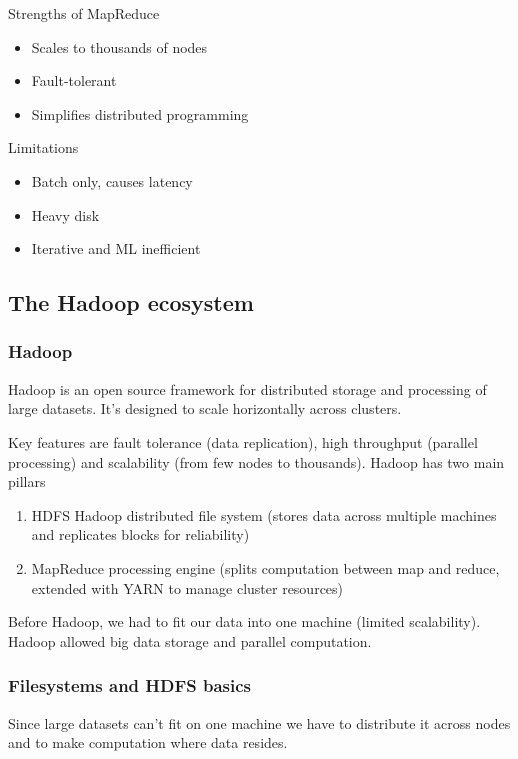 Strengths of MapReduce
\begin{itemize}
    \item Scales to thousands of nodes
    \item Fault-tolerant
    \item Simplifies distributed programming
\end{itemize}

Limitations
\begin{itemize}
    \item Batch only, causes latency
    \item Heavy disk
    \item Iterative and ML inefficient
\end{itemize}

\subsection{The Hadoop ecosystem}

\subsubsection{Hadoop}

Hadoop is an open source framework for distributed storage and processing of large datasets. It's designed to scale horizontally across clusters.

Key features are fault tolerance (data replication), high throughput (parallel processing) and scalability (from few nodes to thousands). 
Hadoop has two main pillars

\begin{enumerate}
    \item HDFS \ra Hadoop distributed file system (stores data across multiple machines and replicates blocks for reliability)
    \item MapReduce \ra processing engine (splits computation between map and reduce, extended with YARN to manage cluster resources)
\end{enumerate}

Before Hadoop, we had to fit our data into one machine (limited scalability). Hadoop allowed big data storage and parallel computation.

\subsubsection{Filesystems and HDFS basics}

Since large datasets can't fit on one machine we have to distribute it across nodes and to make computation where data resides. 

